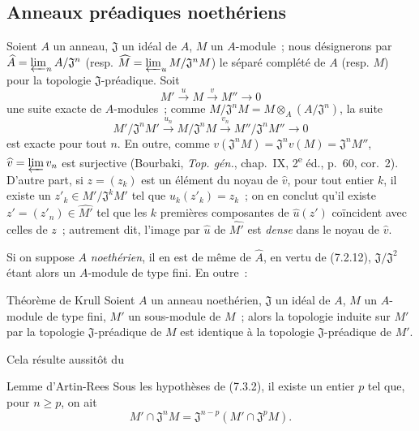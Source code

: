\subsection{Anneaux préadiques noethériens}
\label{subsection:0.7.3-fr}

\begin{env}[7.3.1]
\label{0.7.3.1-fr}
Soient $A$ un anneau, $\mathfrak J$ un idéal de $A$, $M$ un $A$-module~;
nous désignerons par
$\widehat A=\varprojlim_n A/\mathfrak J^n$ (resp.
$\widehat M=\varprojlim_u M/\mathfrak J^nM$) le séparé complété de $A$
(resp. $M$) pour la topologie $\mathfrak J$-préadique. Soit
\[
  M'\xrightarrow{u}M\xrightarrow{v}M''\to0
\]
une suite exacte de $A$-modules~; comme
$M/\mathfrak J^nM=M\otimes_A(A/\mathfrak J^n)$, la suite
\[
  M'/\mathfrak J^nM'\xrightarrow{u_n}
  M/\mathfrak J^nM\xrightarrow{v_n}
  M''/\mathfrak J^nM''\to0
\]
est exacte pour tout $n$. En outre, comme
$v(\mathfrak J^nM)=\mathfrak J^nv(M)=\mathfrak J^nM''$,
$\widehat v=\varprojlim v_n$ est surjective (Bourbaki,
\emph{Top. gén.}, chap.~IX, 2\textsuperscript{e} éd., p.~60, cor.~2).
D'autre part, si $z=(z_k)$ est un élément du noyau de $\widehat v$, pour tout
entier $k$, il existe un $z'_k\in M'/\mathfrak J^kM'$ tel que
$u_k(z'_k)=z_k$~; on en conclut qu'il existe
$z'=(z'_n)\in\widehat{M'}$ tel que les $k$ premières composantes de
$\widehat u(z')$ coïncident avec celles de $z$~; autrement dit, l'image par
$\widehat u$ de $\widehat{M'}$ est \emph{dense} dans le noyau de
$\widehat v$.

Si on suppose $A$ \emph{noethérien}, il en est de même de $\widehat A$, en
vertu de (7.2.12), $\mathfrak J/\mathfrak J^2$ étant alors un $A$-module de
type fini. En outre~:
\end{env}

\begin{namedtheorem}[7.3.2]{Théorème de Krull}
\label{0.7.3.2-fr}
Soient $A$ un anneau noethérien, $\mathfrak J$ un idéal de $A$, $M$ un
$A$-module de type fini, $M'$ un sous-module de $M$~; alors la topologie
induite sur $M'$ par la topologie $\mathfrak J$-préadique de $M$ est identique
à la topologie $\mathfrak J$-préadique de $M'$.
\end{namedtheorem}

Cela résulte aussitôt du

\begin{namedlemma}[7.3.2.1]{Lemme d'Artin-Rees}
\label{0.7.3.2.1-fr}
Sous les hypothèses de (7.3.2), il existe un entier $p$ tel que, pour
$n\geq p$, on ait
\[
  M'\cap\mathfrak J^nM=\mathfrak J^{n-p}
  (M'\cap\mathfrak J^pM).
\]
\end{namedlemma}

